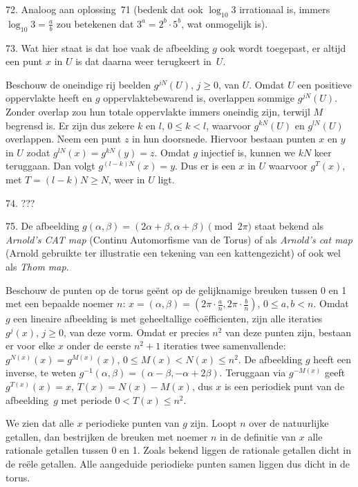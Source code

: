 \begin{problem}{72.}
	Analoog aan oplossing~71 (bedenk dat ook $\log_{10} 3$ irrationaal is, immers $\log_{10} 3 = \frac{a}{b}$ zou betekenen dat $3^a = 2^b \cdot 5^b$, wat onmogelijk is).
\end{problem}

\clearpage

\begin{problem}{73.}
    Wat hier staat is dat hoe vaak de afbeelding $g$ ook wordt toe\-gepast, er altijd een punt $x$ in $U$ is dat daarna weer terugkeert in~$U$.

    Beschouw de oneindige rij beelden $g^{j N}(U)$, $j \geq 0$, van $U$. Omdat $U$ een positieve oppervlakte heeft en $g$ oppervlaktebewarend is, over\-lappen sommige $g^{j N}(U)$. Zonder overlap zou hun totale oppervlakte immers oneindig zijn, terwijl $M$ begrensd is. Er zijn dus zekere $k$ en $l$, $0 \leq k < l$, waarvoor $g^{k N}(U)$ en $g^{l N}(U)$ overlappen. Neem een punt $z$ in hun doorsnede. Hiervoor bestaan punten $x$ en $y$ in $U$ zodat $g^{l N}(x) = g^{k N}(y) = z$. Omdat $g$ injectief is, kunnen we $k N$ keer teruggaan. Dan volgt $g^{(l - k) N}(x) = y$. Dus er is een $x$ in $U$ waarvoor $g^T(x)$, met $T = (l - k) N \geq N$, weer in $U$ ligt.
\end{problem}

\begin{problem}{74.}
    ???
\end{problem}

\begin{problem}{75.}
    De afbeelding $g(\alpha,\beta) = (2 \alpha + \beta,\alpha + \beta) \pmod {2 \pi}$ staat bekend als \textit{Arnold's CAT map} (Continu Automorfisme van de Torus) of als \textit{Arnold's cat map} (Arnold gebruikte ter illustratie een tekening van een kattengezicht) of ook wel als \textit{Thom map}.

    Beschouw de punten op de torus geënt op de gelijknamige breuken tussen 0 en 1 met een bepaalde noemer $n$: $x = (\alpha,\beta) = \left( 2 \pi \cdot \frac{a}{n},2 \pi \cdot \frac{b}{n} \right)$, $0 \leq a,b < n$. Omdat $g$ een lineaire afbeelding is met geheeltallige coëfficienten, zijn alle iteraties $g^j(x)$, $j \geq 0$, van deze vorm. Omdat er precies $n^2$ van deze punten zijn, bestaan er voor elke $x$ onder de eerste $n^2 + 1$ iteraties twee samenvallende: $g^{N(x)}(x) = g^{M(x)}(x)$, \mbox{$0 \leq M(x) < N(x) \leq n^2$}. De afbeelding $g$ heeft een inverse, te weten $g^{-1}(\alpha,\beta) = (\alpha - \beta,-\alpha + 2 \beta)$. Teruggaan via $g^{-M(x)}$ geeft $g^{T(x)}(x) = x$, $T(x) = N(x) - M(x)$, dus $x$ is een periodiek punt van de afbeelding~$g$ met periode $0 < T(x) \leq n^2$.

    We zien dat alle $x$ periodieke punten van $g$ zijn. Loopt $n$ over de natuurlijke getallen, dan bestrijken de breuken met noemer $n$ in de definitie van $x$ alle rationale getallen tussen 0 en 1. Zoals bekend liggen de rationale getallen dicht in de reële getallen. Alle aangeduide periodieke punten samen liggen dus dicht in de torus.
\end{problem}

